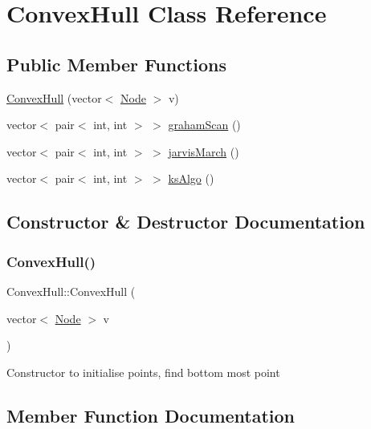 \hypertarget{classConvexHull}{}\section{Convex\+Hull Class Reference}
\label{classConvexHull}
\subsection*{Public Member Functions}
\begin{DoxyCompactItemize}
\item 
\hyperlink{classConvexHull_a9cdd501596800922407e500a72602b2a}{Convex\+Hull} (vector$<$ \hyperlink{classNode}{Node} $>$ v)
\item 
vector$<$ pair$<$ int, int $>$ $>$ \hyperlink{classConvexHull_a2d754f21119fa578681c9350a61240dc}{graham\+Scan} ()
\item 
vector$<$ pair$<$ int, int $>$ $>$ \hyperlink{classConvexHull_a56d248ed5b470d33f2036aae04c597b0}{jarvis\+March} ()
\item 
vector$<$ pair$<$ int, int $>$ $>$ \hyperlink{classConvexHull_afee5633718d639bc8e94b123eea4c168}{ks\+Algo} ()
\end{DoxyCompactItemize}


\subsection{Constructor \& Destructor Documentation}
\mbox{\label{classConvexHull_a9cdd501596800922407e500a72602b2a}} 
\subsubsection{\texorpdfstring{Convex\+Hull()}{ConvexHull()}}
{\footnotesize\ttfamily Convex\+Hull\+::\+Convex\+Hull (\begin{DoxyParamCaption}\item[{vector$<$ \hyperlink{classNode}{Node} $>$}]{v }\end{DoxyParamCaption})}

Constructor to initialise points, find bottom most point 

\subsection{Member Function Documentation}
\mbox{\label{classConvexHull_a2d754f21119fa578681c9350a61240dc}} 
